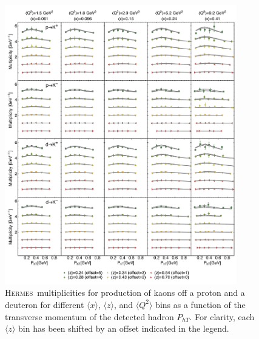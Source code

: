 \documentclass[aps,preprintnumbers,showpacs,nofootinbib,superscriptaddress,floatfix]{revtex4}
\newcommand{\hermes}{\textsc{Hermes}}
\begin{document}
\begin{figure}[h!]
\begin{center}
\includegraphics[width=0.90\textwidth]{plots/Hermes_Kaons_SCIplot_flINDEP.pdf}
\end{center}
\caption{\hermes\ multiplicities for production of kaons off a proton and a deuteron for different $\langle x \rangle$, $\langle z \rangle$, and $\langle Q^2 \rangle$ bins as a function of the transverse momentum of the detected hadron $P_{hT}$. For clarity, each $\langle z \rangle$  bin has been shifted by an offset indicated in the legend.} 
\label{f:H_kaons}
\end{figure}
\end{document}
